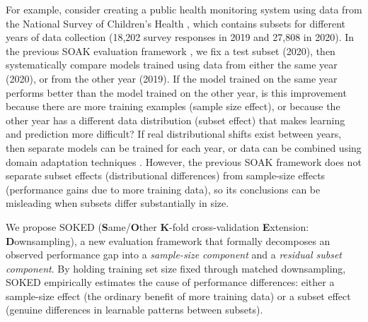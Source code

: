 \documentclass{article}
\begin{document}
For example, consider creating a public health monitoring system using data from the National Survey of Children’s Health \citep{NSCH2019}, which contains subsets for different years of data collection (18,202 survey responses in 2019 and 27,808 in 2020).
In the previous SOAK evaluation framework \citep{hocking2026}, we fix a test subset (2020), then systematically compare models trained using data from either the same year (2020), or from the other year (2019). 
If the model trained on the same year performs better than the model trained on the other year, is this improvement because there are more training examples (sample size effect), or because the other year has a different data distribution (subset effect) that makes learning and prediction more difficult?
If real distributional shifts exist between years, then separate models can be trained for each year, or data can be combined using domain adaptation techniques \citep{CostaJussa2015}.
However, the previous SOAK framework does not separate subset effects (distributional differences) from sample-size effects (performance gains due to more training data), so its conclusions can be misleading when subsets differ substantially in size.

We propose SOKED (\textbf{S}ame/\textbf{O}ther \textbf{K}-fold cross-validation \textbf{E}xtension: \textbf{D}ownsampling), a new evaluation framework that formally decomposes an observed performance gap into a \emph{sample-size component} and a \emph{residual subset component}.
By holding training set size fixed through matched downsampling, SOKED empirically estimates the cause of performance differences: either a sample-size effect (the ordinary benefit of more training data) or a subset effect (genuine differences in learnable patterns between subsets).

\end{document}
